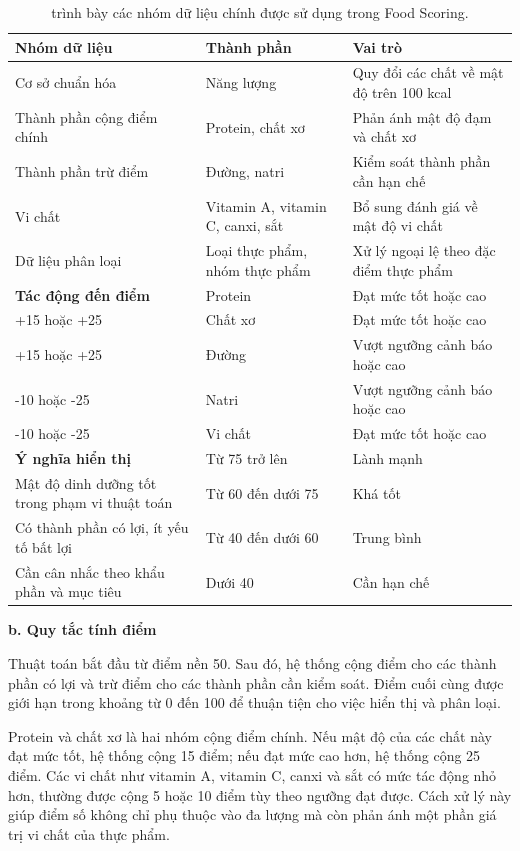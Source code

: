 \documentclass[12pt, a4paper]{report}
\begin{document}
\begin{table}[htbp]
\centering
\caption{trình bày các nhóm dữ liệu chính được sử dụng trong Food Scoring.}
\begin{tabular}{|p{4cm}|p{4cm}|p{7cm}|}
\hline
\textbf{Nhóm dữ liệu} & \textbf{Thành phần} & \textbf{Vai trò} \\
\hline
Cơ sở chuẩn hóa & Năng lượng & Quy đổi các chất về mật độ trên 100 kcal \\
\hline
Thành phần cộng điểm chính & Protein, chất xơ & Phản ánh mật độ đạm và chất xơ \\
\hline
Thành phần trừ điểm & Đường, natri & Kiểm soát thành phần cần hạn chế \\
\hline
Vi chất & Vitamin A, vitamin C, canxi, sắt & Bổ sung đánh giá về mật độ vi chất \\
\hline
Dữ liệu phân loại & Loại thực phẩm, nhóm thực phẩm & Xử lý ngoại lệ theo đặc điểm thực phẩm \\
\hline
\hline
\hline
\textbf{Tác động đến điểm} & Protein & Đạt mức tốt hoặc cao \\
\hline
+15 hoặc +25 & Chất xơ & Đạt mức tốt hoặc cao \\
\hline
+15 hoặc +25 & Đường & Vượt ngưỡng cảnh báo hoặc cao \\
\hline
-10 hoặc -25 & Natri & Vượt ngưỡng cảnh báo hoặc cao \\
\hline
-10 hoặc -25 & Vi chất & Đạt mức tốt hoặc cao \\
\hline
\hline
\hline
\hline
\textbf{Ý nghĩa hiển thị} & Từ 75 trở lên & Lành mạnh \\
\hline
Mật độ dinh dưỡng tốt trong phạm vi thuật toán & Từ 60 đến dưới 75 & Khá tốt \\
\hline
Có thành phần có lợi, ít yếu tố bất lợi & Từ 40 đến dưới 60 & Trung bình \\
\hline
Cần cân nhắc theo khẩu phần và mục tiêu & Dưới 40 & Cần hạn chế \\
\hline
\hline
\hline
\end{tabular}
\end{table}

\textbf{b. Quy tắc tính điểm}

Thuật toán bắt đầu từ điểm nền 50. Sau đó, hệ thống cộng điểm cho các thành phần có lợi và trừ điểm cho các thành phần cần kiểm soát. Điểm cuối cùng được giới hạn trong khoảng từ 0 đến 100 để thuận tiện cho việc hiển thị và phân loại.

Protein và chất xơ là hai nhóm cộng điểm chính. Nếu mật độ của các chất này đạt mức tốt, hệ thống cộng 15 điểm; nếu đạt mức cao hơn, hệ thống cộng 25 điểm. Các vi chất như vitamin A, vitamin C, canxi và sắt có mức tác động nhỏ hơn, thường được cộng 5 hoặc 10 điểm tùy theo ngưỡng đạt được. Cách xử lý này giúp điểm số không chỉ phụ thuộc vào đa lượng mà còn phản ánh một phần giá trị vi chất của thực phẩm.
\end{document}
